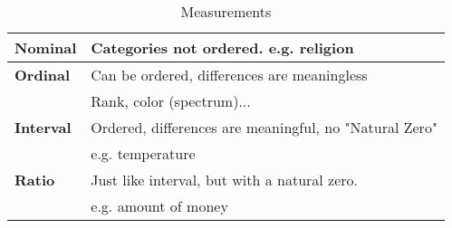 \documentclass{book}
\begin{document}
\begin{table}[htbp]
  \centering
  \begin{tabular}{>{\bfseries}l l}
      \toprule
      Nominal & Categories \textbf{not} ordered. e.g. religion \\
      \midrule
      Ordinal & Can be ordered, differences are meaningless \\
              & Rank, color (spectrum)...\\
      \midrule
      Interval & Ordered, differences are meaningful, no "Natural Zero" \\
               & e.g. temperature \\
      \midrule
      Ratio & Just like interval, but with a natural zero.\\
            & e.g. amount of money  \\
      \bottomrule
  \end{tabular}
  \caption{Measurements}
  \label{tab:vocab-5}
\end{table}

\end{document}
